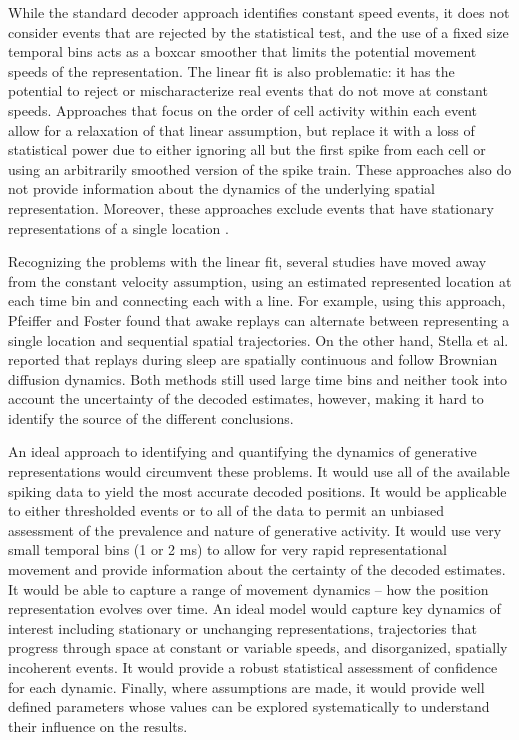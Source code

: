 \documentclass[times, twoside]{zHenriquesLab-StyleBioRxiv}
\begin{document}
While the standard decoder approach identifies constant speed events, it does not consider events that are rejected by the statistical test, and the use of a fixed size temporal bins acts as a boxcar smoother that limits the potential movement speeds of the representation. The linear fit is also problematic: it has the potential to reject or mischaracterize real events that do not move at constant speeds. Approaches that focus on the order of cell activity within each event \cite{LeeMemorySequentialExperience2002, GuptaHippocampalReplayNot2010} allow for a relaxation of that linear assumption, but replace it with a loss of statistical power due to either ignoring all but the first spike from each cell or using an arbitrarily smoothed version of the spike train. These approaches also do not provide information about the dynamics of the underlying spatial representation. Moreover, these approaches exclude events that  have stationary representations of a single location \cite{JaiDistincthippocampalcorticalmemory2017, FarooqEmergencepreconfiguredplastic2019}. 

Recognizing the problems with the linear fit, several studies have moved away from the constant velocity assumption, using an estimated represented location at each time bin and connecting each with a line. For example, using this approach, Pfeiffer and Foster \cite{PfeifferAutoassociativedynamicsgeneration2015} found that awake replays can alternate between representing a single location and sequential spatial trajectories. On the other hand, Stella et al. \cite{StellaHippocampalReactivationRandom2019} reported that replays during sleep are spatially continuous and follow Brownian diffusion dynamics. Both methods still used large time bins and neither took into account the uncertainty of the decoded estimates, however, making it hard to identify the source of the different conclusions.

An ideal approach to identifying and quantifying the dynamics of generative representations would circumvent these problems. It would use all of the available spiking data to yield the most accurate decoded positions. It would be applicable to either thresholded events or to all of the data to permit an unbiased assessment of the prevalence and nature of generative activity. It would use very small temporal bins (1 or 2 ms) to allow for very rapid representational movement and provide information about the certainty of the decoded estimates. It would be able to capture a range of movement dynamics -- how the position representation evolves over time. An ideal model would capture key dynamics of interest including stationary or unchanging representations, trajectories that progress through space at constant or variable speeds, and disorganized, spatially incoherent events. It would provide a robust statistical assessment of confidence for each dynamic. Finally, where assumptions are made, it would provide well defined parameters whose values can be explored systematically to understand their influence on the results.
\end{document}
